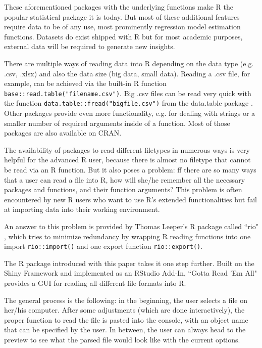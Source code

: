 \documentclass[12pt]{article} %
\newcommand{\li}{\lstinline}
\begin{document}
These aforementioned packages with the underlying functions make R the popular statistical package it is today. But most of these additional features require data to be of any use, most prominently regression model estimation functions. Datasets do exist shipped with R but for most academic purposes, external data will be required to generate new insights.

There are multiple ways of reading data into R depending on the data type (e.g. .csv, .xlsx) and also the data size (big data, small data). Reading a .csv file, for example, can be achieved via the built-in R function \li{base::read.table("filename.csv")}. Big .csv files can be read very quick with the function \li{data.table::fread("bigfile.csv")} from the data.table package \cite[Dowle et al 2015]{w5}. Other packages provide even more functionality, e.g. for dealing with strings or a smaller number of required arguments inside of a function. Most of those packages are also available on CRAN. 

The availability of packages to read different filetypes in numerous ways is very helpful for the advanced R user, because there is almost no filetype that cannot be read via an R function. But it also poses a problem: ff there are so many ways that a user can read a file into R, how will she/he remember all the necessary packages and functions, and their function arguments? This problem is often encountered by new R users who want to use R's extended functionalities but fail at importing data into their working environment.

An answer to this problem is provided by Thomas Leeper's R package called ``rio" \cite[Leeper et al 2016]{w6}, which tries to minimize redundancy by wrapping R reading functions into one import \li{rio::import()} and one export function \li{rio::export()}. 

The R package introduced with this paper takes it one step further. Built on the Shiny Framework and implemented as an RStudio Add-In, ``Gotta Read 'Em All" provides a GUI for reading all different file-formats into R. 

The general process is the following: in the beginning, the user selects a file on her/his computer. After some adjustments (which are done interactively), the proper function to read the file is pasted into the console, with an object name that can be specified by the user. In between, the user can always head to the preview to see what the parsed file would look like with the current options.
\end{document}
